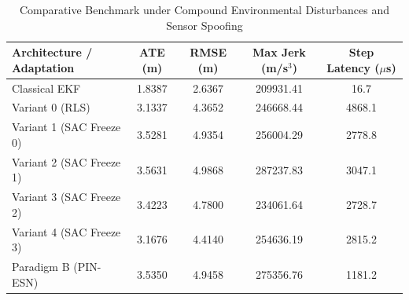 \begin{table}[t]
\centering
\caption{Comparative Benchmark under Compound Environmental Disturbances and Sensor Spoofing}
\label{tab:ablation_results}
\begin{tabular}{lcccc}
\toprule
\textbf{Architecture / Adaptation} & \textbf{ATE (m)} & \textbf{RMSE (m)} & \textbf{Max Jerk (m/s$^3$)} & \textbf{Step Latency ($\mu$s)} \\
\midrule
Classical EKF                & 1.8387 & 2.6367 & 209931.41 &     16.7 \\
Variant 0 (RLS)              & 3.1337 & 4.3652 & 246668.44 &   4868.1 \\
Variant 1 (SAC Freeze 0)     & 3.5281 & 4.9354 & 256004.29 &   2778.8 \\
Variant 2 (SAC Freeze 1)     & 3.5631 & 4.9868 & 287237.83 &   3047.1 \\
Variant 3 (SAC Freeze 2)     & 3.4223 & 4.7800 & 234061.64 &   2728.7 \\
Variant 4 (SAC Freeze 3)     & 3.1676 & 4.4140 & 254636.19 &   2815.2 \\
Paradigm B (PIN-ESN)         & 3.5350 & 4.9458 & 275356.76 &   1181.2 \\
\bottomrule
\end{tabular}
\end{table}
